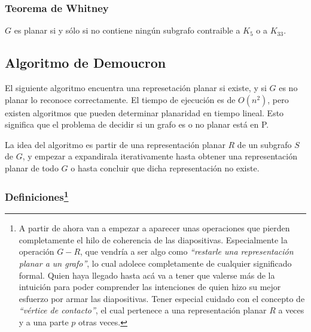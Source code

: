 \subsubsection{Teorema de Whitney}

$G$ es planar si y s\'olo si no contiene ning\'un subgrafo contraible a $K_{5}$ o a $K_{33}$.

\subsection{Algoritmo de Demoucron}

El siguiente algoritmo encuentra una represetaci\'on planar si existe, y si $G$ es no planar lo reconoce correctamente. El tiempo de ejecuci\'on es de $O(n^2)$, pero existen algoritmos que pueden determinar planaridad en tiempo lineal. Esto significa que el problema de decidir si un grafo es o no planar est\'a en P.

La idea del algoritmo es partir de una representaci\'on planar $R$ de un subgrafo $S$ de $G$, y empezar a expandirala iterativamente hasta obtener una representaci\'on planar de todo $G$ o hasta concluir que dicha representaci\'on no existe.

\subsubsection{Definiciones\footnote{A partir de ahora van a empezar a aparecer unas operaciones que pierden completamente el hilo de coherencia de las diapositivas. Especialmente la operaci\'on $G - R$, que vendr\'ia a ser algo como \emph{``restarle una representaci\'on planar a un grafo''}, lo cual adolece completamente de cualquier significado formal. Quien haya llegado hasta ac\'a va a tener que valerse m\'as de la intuici\'on para poder comprender las intenciones de quien hizo su mejor esfuerzo por armar las diapositivas. Tener especial cuidado con el concepto de \emph{``v\'ertice de contacto''}, el cual pertenece a una representaci\'on planar $R$ a veces y a una parte $p$ otras veces.}}


